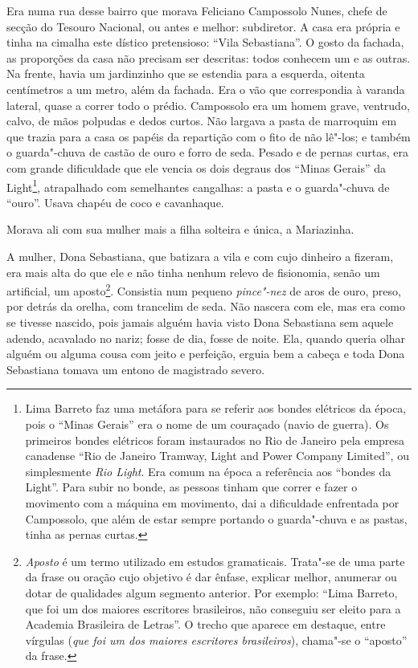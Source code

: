 Era numa rua desse bairro que morava Feliciano Campossolo Nunes, chefe
de secção do Tesouro Nacional, ou antes e melhor: subdiretor. A casa era
própria e tinha na cimalha este dístico pretensioso: ``Vila
Sebastiana''. O gosto da fachada, as proporções da casa não precisam ser
descritas: todos conhecem um e as outras. Na frente, havia um
jardinzinho que se estendia para a esquerda, oitenta centímetros a um
metro, além da fachada. Era o vão que correspondia à varanda lateral,
quase a correr todo o prédio. Campossolo era um homem grave, ventrudo,
calvo, de mãos polpudas e dedos curtos. Não largava a pasta de marroquim
em que trazia para a casa os papéis da repartição com o fito de não
lê"-los; e também o guarda"-chuva de castão de ouro e forro de seda.
Pesado e de pernas curtas, era com grande dificuldade que ele vencia os
dois degraus dos ``Minas Gerais'' da Light\footnote{Lima Barreto faz uma
  metáfora para se referir aos bondes elétricos da época, pois o ``Minas
  Gerais'' era o nome de um couraçado (navio de guerra). Os primeiros
  bondes elétricos foram instaurados no Rio de Janeiro pela empresa
  canadense ``Rio de Janeiro Tramway, Light and Power Company Limited'',
  ou simplesmente \emph{Rio Light}. Era comum na época a referência aos
  ``bondes da Light''. Para subir no bonde, as pessoas tinham que correr
  e fazer o movimento com a máquina em movimento, dai a dificuldade
  enfrentada por Campossolo, que além de estar sempre portando o
  guarda"-chuva e as pastas, tinha as pernas curtas.}, atrapalhado com
semelhantes cangalhas: a pasta e o guarda"-chuva de ``ouro''. Usava
chapéu de coco e cavanhaque.

Morava ali com sua mulher mais a filha solteira e única, a Mariazinha.

A mulher, Dona Sebastiana, que batizara a vila e com cujo dinheiro a
fizeram, era mais alta do que ele e não tinha nenhum relevo de
fisionomia, senão um artificial, um aposto\footnote{\emph{Aposto} é um
  termo utilizado em estudos gramaticais. Trata"-se de uma parte da frase
  ou oração cujo objetivo é dar ênfase, explicar melhor, anumerar ou
  dotar de qualidades algum segmento anterior. Por exemplo: ``Lima
  Barreto, que foi um dos maiores
  escritores brasileiros, não conseguiu ser eleito para a Academia
  Brasileira de Letras''. O trecho que aparece em destaque, entre
  vírgulas (\emph{que foi um dos maiores escritores brasileiros}),
  chama"-se o ``aposto'' da frase.}. Consistia num pequeno
\emph{pince"-nez} de aros de ouro, preso, por detrás da orelha, com
trancelim de seda. Não nascera com ele, mas era como se tivesse nascido,
pois jamais alguém havia visto Dona Sebastiana sem aquele adendo,
acavalado no nariz; fosse de dia, fosse de noite. Ela, quando queria
olhar alguém ou alguma cousa com jeito e perfeição, erguia bem a cabeça
e toda Dona Sebastiana tomava um entono de magistrado severo.

